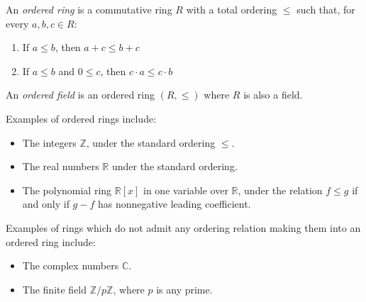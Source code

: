 \documentclass[12pt]{article}
\begin{document}
An \emph{ordered ring} is a commutative ring $R$ with a total ordering $\leq$ such that, for every $a,b,c \in R$:
\begin{enumerate}
\item If $a \leq b$, then $a+c \leq b+c$
\item If $a \leq b$ and $0 \leq c$, then $c \cdot a \leq c \cdot b$
\end{enumerate}

An \emph{ordered field} is an ordered ring $(R,\leq)$ where $R$ is also a field.

Examples of ordered rings include:
\begin{itemize}
\item The integers $\mathbb{Z}$, under the standard ordering $\leq$.
\item The real numbers $\mathbb{R}$ under the standard ordering.
\item The polynomial ring $\mathbb{R}[x]$ in one variable over $\mathbb{R}$, under the relation $f \leq g$ if and only if $g-f$ has nonnegative leading coefficient.
\end{itemize}

Examples of rings which do not admit any ordering relation making them into an ordered ring include:
\begin{itemize}
\item The complex numbers $\mathbb{C}$.
\item The finite field $\mathbb{Z}/p\mathbb{Z}$, where $p$ is any prime.
\end{itemize}
\end{document}
